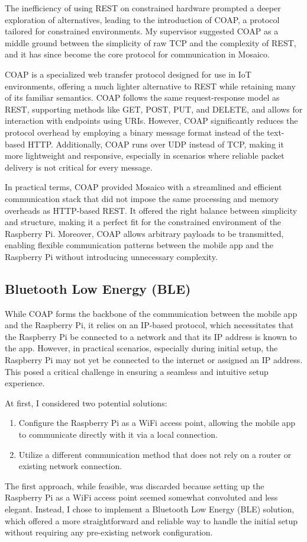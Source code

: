 The inefficiency of using REST on constrained hardware prompted a deeper exploration of alternatives, leading to the introduction of COAP, a protocol tailored for constrained environments. My supervisor suggested COAP as a middle ground between the simplicity of raw TCP and the complexity of REST, and it has since become the core protocol for communication in Mosaico.

COAP is a specialized web transfer protocol designed for use in IoT environments, offering a much lighter alternative to REST while retaining many of its familiar semantics. COAP follows the same request-response model as REST, supporting methods like GET, POST, PUT, and DELETE, and allows for interaction with endpoints using URIs. However, COAP significantly reduces the protocol overhead by employing a binary message format instead of the text-based HTTP. Additionally, COAP runs over UDP instead of TCP, making it more lightweight and responsive, especially in scenarios where reliable packet delivery is not critical for every message.

In practical terms, COAP provided Mosaico with a streamlined and efficient communication stack that did not impose the same processing and memory overheads as HTTP-based REST. It offered the right balance between simplicity and structure, making it a perfect fit for the constrained environment of the Raspberry Pi. Moreover, COAP allows arbitrary payloads to be transmitted, enabling flexible communication patterns between the mobile app and the Raspberry Pi without introducing unnecessary complexity.


\subsection{Bluetooth Low Energy (BLE)}

While COAP forms the backbone of the communication between the mobile app and the Raspberry Pi, it relies on an IP-based protocol, which necessitates that the Raspberry Pi be connected to a network and that its IP address is known to the app. However, in practical scenarios, especially during initial setup, the Raspberry Pi may not yet be connected to the internet or assigned an IP address. This posed a critical challenge in ensuring a seamless and intuitive setup experience.

At first, I considered two potential solutions: 

\begin{enumerate}
    \item Configure the Raspberry Pi as a WiFi access point, allowing the mobile app to communicate directly with it via a local connection.
    \item Utilize a different communication method that does not rely on a router or existing network connection.
\end{enumerate}
The first approach, while feasible, was discarded because setting up the Raspberry Pi as a WiFi access point seemed somewhat convoluted and less elegant. Instead, I chose to implement a Bluetooth Low Energy (BLE) solution, which offered a more straightforward and reliable way to handle the initial setup without requiring any pre-existing network configuration.

